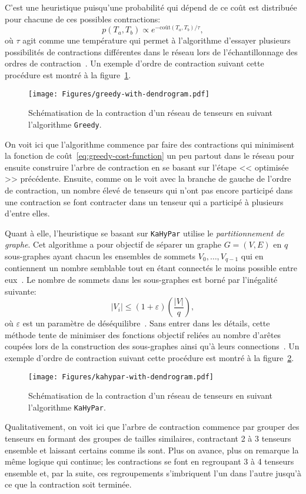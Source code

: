 C'est une heuristique puisqu'une probabilité qui dépend de ce coût est distribuée pour chacune de ces possibles contractions:
\begin{equation}
    p(T_a, T_b) \propto e^{-\mathrm{coût}(T_a, T_b)/\tau},
\end{equation}
où $\tau$ agit comme une température qui permet à l'algorithme d'essayer plusieurs possibilités de contractions différentes dans le réseau lors de l'échantillonnage des ordres de contraction~\cite{gray_hyper-optimized_2021}.
Un exemple d'ordre de contraction suivant cette procédure est montré à la figure~\ref{fig:greedy-with-dendrogram}.
\begin{figure}[h!]
    \centering
    \texttt{[image: Figures/greedy-with-dendrogram.pdf]}
    \caption{Schématisation de la contraction d'un réseau de tenseurs en suivant l'algorithme \texttt{Greedy}.}
    \label{fig:greedy-with-dendrogram}
\end{figure}
On voit ici que l'algorithme commence par faire des contractions qui minimisent la fonction de coût~\ref{eq:greedy-cost-function} un peu partout dans le réseau pour ensuite construire l'arbre de contraction en se basant sur l'étape << optimisée >> précédente.
Ensuite, comme on le voit avec la branche de gauche de l'ordre de contraction, un nombre élevé de tenseurs qui n'ont pas encore participé dans une contraction se font contracter dans un tenseur qui a participé à plusieurs d'entre elles.

Quant à elle, l'heuristique se basant sur \verb|KaHyPar| utilise le \textit{partitionnement de graphe}.
Cet algorithme a pour objectif de séparer un graphe $G = (V, E)$ en $q$ sous-graphes ayant chacun les ensembles de sommets $V_0, \dots, V_{q-1}$ qui en contiennent un nombre semblable tout en étant connectés le moins possible entre eux~\cite{paper-kahypar}.
Le nombre de sommets dans les sous-graphes est borné par l'inégalité suivante:
\begin{equation}
    |V_i| \leq (1 + \varepsilon)\left(\frac{|V|}{q}\right),
\end{equation}
où $\varepsilon$ est un paramètre de déséquilibre~\cite{paper-kahypar}.
Sans entrer dans les détails, cette méthode tente de minimiser des fonctions objectif reliées au nombre d'arêtes coupées lors de la construction des sous-graphes ainsi qu'à leurs connections~\cite{PhDThesis-kahypar}.
Un exemple d'ordre de contraction suivant cette procédure est montré à la figure~\ref{fig:kahypar-with-dendrogram}.
\begin{figure}[h!]
    \centering
    \texttt{[image: Figures/kahypar-with-dendrogram.pdf]}
    \caption{Schématisation de la contraction d'un réseau de tenseurs en suivant l'algorithme \texttt{KaHyPar}.}
    \label{fig:kahypar-with-dendrogram}
\end{figure}
Qualitativement, on voit ici que l'arbre de contraction commence par grouper des tenseurs en formant des groupes de tailles similaires, contractant 2 à 3 tenseurs ensemble et laissant certains comme ils sont.
Plus on avance, plus on remarque la même logique qui continue; les contractions se font en regroupant 3 à 4 tenseurs ensemble et, par la suite, ces regroupements s'imbriquent l'un dans l'autre jusqu'à ce que la contraction soit terminée.

